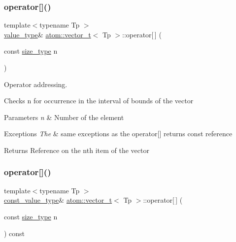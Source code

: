 \subsubsection{\texorpdfstring{operator[]()}{operator[]()}\hspace{0.1cm}{\footnotesize\ttfamily [1/2]}}
{\footnotesize\ttfamily template$<$typename Tp $>$ \\
\hyperlink{classatom_1_1vector__t_a558283a4fed53856d445ceb61ac96d94}{value\+\_\+type}\& \hyperlink{classatom_1_1vector__t}{atom\+::vector\+\_\+t}$<$ Tp $>$\+::operator\mbox{[}$\,$\mbox{]} (\begin{DoxyParamCaption}\item[{const \hyperlink{classatom_1_1vector__t_a1790d79321f4fa8d2580474dd0f56033}{size\+\_\+type}}]{n }\end{DoxyParamCaption})\hspace{0.3cm}{\ttfamily [inline]}}



Operator addressing. 

Checks n for occurrence in the interval of bounds of the vector 
\begin{DoxyParams}{Parameters}
{\em n} & Number of the element \\
\hline
\end{DoxyParams}

\begin{DoxyExceptions}{Exceptions}
{\em The} & same exceptions as the operator\mbox{[}\mbox{]} returns const reference \\
\hline
\end{DoxyExceptions}
\begin{DoxyReturn}{Returns}
Reference on the nth item of the vector 
\end{DoxyReturn}
\mbox{\label{classatom_1_1vector__t_ab3cbcfdd1fdadcd927eb1ef629d2f814}} 
\subsubsection{\texorpdfstring{operator[]()}{operator[]()}\hspace{0.1cm}{\footnotesize\ttfamily [2/2]}}
{\footnotesize\ttfamily template$<$typename Tp $>$ \\
\hyperlink{classatom_1_1vector__t_a14fe7ee127e522f41f345462311c924e}{const\+\_\+value\+\_\+type}\& \hyperlink{classatom_1_1vector__t}{atom\+::vector\+\_\+t}$<$ Tp $>$\+::operator\mbox{[}$\,$\mbox{]} (\begin{DoxyParamCaption}\item[{const \hyperlink{classatom_1_1vector__t_a1790d79321f4fa8d2580474dd0f56033}{size\+\_\+type}}]{n }\end{DoxyParamCaption}) const\hspace{0.3cm}{\ttfamily [inline]}}



